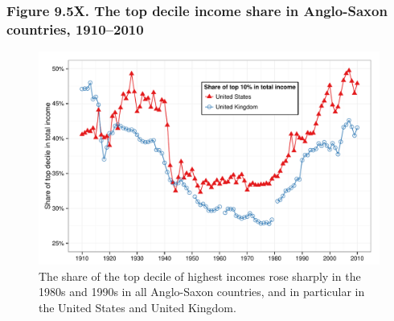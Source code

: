 \documentclass[t]{beamer}\usepackage[]{graphicx}\usepackage[]{color}
\newenvironment{knitrout}{}{} %
\begin{document}
\begin{frame}[label=Figure_9_5X]
\frametitle{Figure 9.5X. The top decile income share in Anglo-Saxon countries, 1910--2010}
\begin{figure}[t]
\begin{minipage}[b]{\textwidth}
\centering
\begin{knitrout}\footnotesize
{}\color{fgcolor}

{\centering \includegraphics[width=1\linewidth]{figures/color/Figure_9_5X} 

}



\end{knitrout}
\caption{The share of the top decile of highest incomes rose sharply in the 1980s and 1990s in all Anglo-Saxon countries, and in particular in the United States and United Kingdom.}
\end{minipage}
\end{figure}
\end{frame}
\end{document}
